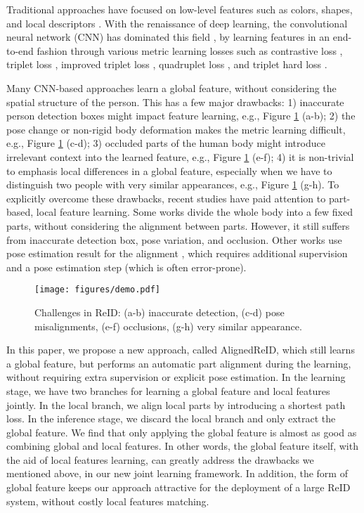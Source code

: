 \documentclass[10pt,twocolumn,letterpaper]{article}
\begin{document}
Traditional approaches have focused on low-level features such as colors, shapes, and local descriptors \cite{farenzena2010person, hamdoun2008person}.
With the renaissance of deep learning, the convolutional neural network (CNN) has dominated this field \cite{matsukawa2016person, varior2016gated, cheng2016person, zheng2016person, lin2017improving, matsukawa2016person}, by learning features in an end-to-end fashion through various metric learning losses such as contrastive loss \cite{varior2016gated}, triplet loss \cite{liu2017end}, improved triplet loss \cite{cheng2016person}, quadruplet loss \cite{chen2017beyond}, and triplet hard loss \cite{hermans2017defense}.

Many CNN-based approaches learn a global feature, without considering the spatial structure of the person. This has a few major drawbacks:
1) inaccurate person detection boxes might impact feature learning, e.g., Figure \ref{fig:demo} (a-b);
2) the pose change or non-rigid body deformation makes the metric learning difficult, e.g., Figure \ref{fig:demo} (c-d); 
3) occluded parts of the human body might introduce irrelevant context into the learned feature, e.g., Figure \ref{fig:demo} (e-f);
4) it is non-trivial to emphasis local differences in a global feature, especially when we have to distinguish two people with very similar appearances, e.g., Figure \ref{fig:demo} (g-h).
To explicitly overcome these drawbacks, recent studies have paid attention to part-based, local feature learning.
Some works \cite{varior2016siamese, xiao2016cross, yao2017deep} divide the whole body into a few fixed parts, without considering the alignment between parts.
However, it still suffers from inaccurate detection box, pose variation, and occlusion.
Other works use pose estimation result for the alignment \cite{zheng2017pose, wei2017glad, zhao2017spindle}, which requires additional supervision and a pose estimation step (which is often error-prone). 
\begin{figure}[t]
\centering
\texttt{[image: figures/demo.pdf]}
\caption{Challenges in ReID: (a-b) inaccurate detection, (c-d) pose misalignments,
(e-f) occlusions, (g-h) very similar appearance.}
\label{fig:demo}
\end{figure}

In this paper, we propose a new approach, called AlignedReID, which still learns a global feature, but performs an automatic part alignment during the learning, without requiring extra supervision or explicit pose estimation.
In the learning stage, we have two branches for learning a global feature and local features jointly. In the local branch, we align local parts by introducing a shortest path loss.
In the inference stage, we discard the local branch and only extract the global feature.
We find that only applying the global feature is almost as good as combining global and local features.
In other words, the global feature itself, with the aid of local features learning, can greatly address the drawbacks we mentioned above, in our new joint learning framework.
In addition, the form of global feature keeps our approach attractive for the deployment of a large ReID system, without costly local features matching.    
\end{document}
